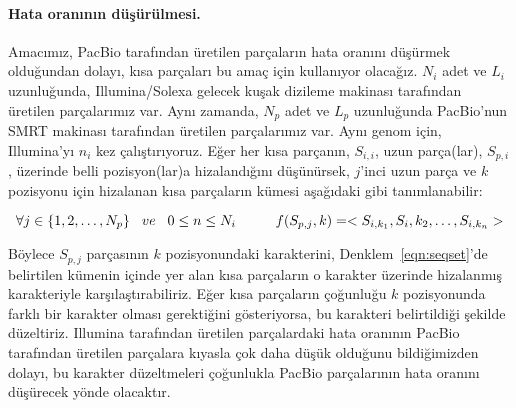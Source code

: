 \paragraph{Hata oranının düşürülmesi.}
Amacımız, PacBio tarafından üretilen parçaların hata oranını düşürmek olduğundan dolayı, kısa parçaları bu amaç için kullanıyor olacağız. $N_i$ adet ve $L_i$ uzunluğunda, Illumina/Solexa gelecek kuşak dizileme makinası tarafından üretilen parçalarımız var. Aynı zamanda, $N_p$ adet ve $L_p$ uzunluğunda PacBio'nun SMRT makinası tarafından üretilen parçalarımız var. Aynı genom için, Illumina'yı $n_i$ kez çalıştırıyoruz. Eğer her kısa parçanın, $S_{i,i}$, uzun parça(lar), $S_{p,i}$, üzerinde belli pozisyon(lar)a hizalandığını düşünürsek, $j$'inci uzun parça ve $k$ pozisyonu için hizalanan kısa parçaların kümesi aşağıdaki gibi tanımlanabilir:

\begin{equation} \label{eqn:seqset}
\forall j \in \{1,2, \dots, N_p\} \hspace{0.3cm} ve \hspace{0.3cm}  0 \leq n \leq N_i \hspace{1cm}  f(S_{p,j}, k) = < S_{i,k_1},  S_i,k_2 , \dots, S_{i,k_n} >
\end{equation}

Böylece $S_{p,j}$ parçasının $k$ pozisyonundaki karakterini, Denklem~\ref{eqn:seqset}'de belirtilen kümenin içinde yer alan kısa parçaların o karakter üzerinde hizalanmış karakteriyle karşılaştırabiliriz. Eğer kısa parçaların çoğunluğu $k$ pozisyonunda farklı bir karakter olması gerektiğini gösteriyorsa, bu karakteri belirtildiği şekilde düzeltiriz. Illumina tarafından üretilen parçalardaki hata oranının PacBio tarafından üretilen parçalara kıyasla çok daha düşük olduğunu bildiğimizden dolayı, bu karakter düzeltmeleri çoğunlukla PacBio parçalarının hata oranını düşürecek yönde olacaktır.

